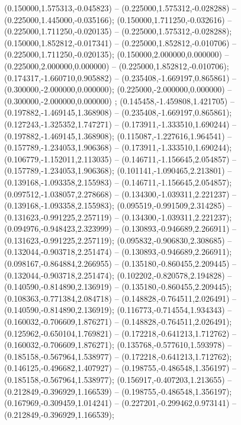  (0.150000,1.575313,-0.045823) -- (0.225000,1.575312,-0.028288) -- (0.225000,1.445000,-0.035166);
 (0.150000,1.711250,-0.032616) -- (0.225000,1.711250,-0.020135) -- (0.225000,1.575312,-0.028288);
 (0.150000,1.852812,-0.017341) -- (0.225000,1.852812,-0.010706) -- (0.225000,1.711250,-0.020135);
 (0.150000,2.000000,0.000000) -- (0.225000,2.000000,0.000000) -- (0.225000,1.852812,-0.010706);
 (0.174317,-1.660710,0.905882) -- (0.235408,-1.669197,0.865861) -- (0.300000,-2.000000,0.000000);
 (0.225000,-2.000000,0.000000) -- (0.300000,-2.000000,0.000000) ;
 (0.145458,-1.459808,1.421705) -- (0.197882,-1.469145,1.368908) -- (0.235408,-1.669197,0.865861);
 (0.127243,-1.325352,1.747271) -- (0.173911,-1.333510,1.690244) -- (0.197882,-1.469145,1.368908);
 (0.115087,-1.227616,1.964541) -- (0.157789,-1.234053,1.906368) -- (0.173911,-1.333510,1.690244);
 (0.106779,-1.152011,2.113035) -- (0.146711,-1.156645,2.054857) -- (0.157789,-1.234053,1.906368);
 (0.101141,-1.090465,2.213801) -- (0.139168,-1.093358,2.155983) -- (0.146711,-1.156645,2.054857);
 (0.097512,-1.038057,2.278668) -- (0.134300,-1.039311,2.221237) -- (0.139168,-1.093358,2.155983);
 (0.095519,-0.991509,2.314285) -- (0.131623,-0.991225,2.257119) -- (0.134300,-1.039311,2.221237);
 (0.094976,-0.948423,2.323999) -- (0.130893,-0.946689,2.266911) -- (0.131623,-0.991225,2.257119);
 (0.095832,-0.906830,2.308685) -- (0.132044,-0.903718,2.251474) -- (0.130893,-0.946689,2.266911);
 (0.098167,-0.864884,2.266955) -- (0.135180,-0.860455,2.209445) -- (0.132044,-0.903718,2.251474);
 (0.102202,-0.820578,2.194828) -- (0.140590,-0.814890,2.136919) -- (0.135180,-0.860455,2.209445);
 (0.108363,-0.771384,2.084718) -- (0.148828,-0.764511,2.026491) -- (0.140590,-0.814890,2.136919);
 (0.116773,-0.714554,1.934343) -- (0.160032,-0.706609,1.876271) -- (0.148828,-0.764511,2.026491);
 (0.125962,-0.650104,1.769821) -- (0.172218,-0.641213,1.712762) -- (0.160032,-0.706609,1.876271);
 (0.135768,-0.577610,1.593978) -- (0.185158,-0.567964,1.538977) -- (0.172218,-0.641213,1.712762);
 (0.146125,-0.496682,1.407927) -- (0.198755,-0.486548,1.356197) -- (0.185158,-0.567964,1.538977);
 (0.156917,-0.407203,1.213655) -- (0.212849,-0.396929,1.166539) -- (0.198755,-0.486548,1.356197);
 (0.167969,-0.309459,1.014241) -- (0.227201,-0.299462,0.973141) -- (0.212849,-0.396929,1.166539);
